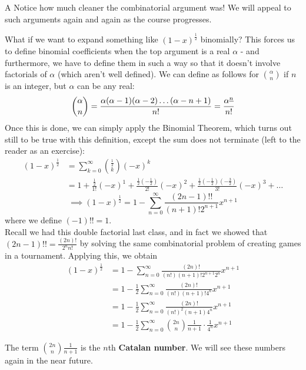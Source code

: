 \documentclass[11pt,twosided]{article}
\newcommand{\half}{\ensuremath{\frac{1}{2}}}
\begin{document}
\begin{reflection}{A}
Notice how much cleaner the combinatorial argument was! We will appeal to such arguments again and again as the course progresses.
\end{reflection}
What if we want to expand something like $(1-x)^{\frac{1}{2}}$ binomially? This forces us to define binomial coefficients when the top argument is a real $\alpha$ - and furthermore, we have to define them in such a way so that it doesn't involve factorials of $\alpha$ (which aren't well defined). We can define as follows for $\binom{\alpha}{n}$ if $n$ is an integer, but $\alpha$ can be any real: 
\[
	\binom{\alpha}{n} =  \frac{\alpha (\alpha - 1) (\alpha - 2) \ldots (\alpha - n + 1)}{n! } = \frac{{\alpha}^{\underline{n}}}{n!}
\]
Once this is done, we can simply apply the Binomial Theorem, which turns out still to be true with this definition, except the sum does not terminate (left to the reader as an exercise): 
\begin{align*}
(1-x)^{\frac{1}{2}} &= \sum_{k=0}^{\infty} \binom{\half}{k} (-x)^k \\
&= 1 + \frac{\half}{1!}(-x)^1 + \frac{\half \left(-\half \right)}{2!} (-x)^2 + \frac{\half \left(-\half \right) \left(-\frac{3}{2} \right)}{3!} (-x)^3  + \ldots 
\end{align*}
\[
\implies (1-x)^{\frac{1}{2}} = 1 - \sum_{n=0}^{\infty} \frac{(2n-1)!!}{(n+1)!2^{n+1}} x^{n+1}	
\]
where we define $(-1)!! = 1$. \\
Recall we had this double factorial last class, and in fact we showed that $(2n-1)!! = \frac{(2n)!}{2^n n!}$ by solving the same combinatorial problem of creating games in a tournament. Applying this, we obtain
\begin{align*}
(1-x)^{\frac{1}{2}} &= 1 - \sum_{n=0}^{\infty} \frac{(2n)!}{(n!)(n+1)!2^{n+1}2^n} x^{n+1}	\\
&= 1 - \frac{1}{2}\sum_{n=0}^{\infty} \frac{(2n)!}{(n!)(n+1)! 4^{n}} x^{n+1} \\
&= 1 - \frac{1}{2}\sum_{n=0}^{\infty} \frac{(2n)!}{(n!)^2(n+1) 4^{n}} x^{n+1}\\
&=  1 - \frac{1}{2}\sum_{n=0}^{\infty} \binom{2n}{n} \frac{1}{n+1}\cdot \frac{1}{4^n} x^{n+1}
\end{align*}
\begin{remark}
The term $\binom{2n}{n} \frac{1}{n+1}$ is the $n$th \textbf{Catalan number}. We will see these numbers again in the near future. 
\end{remark}
\end{document}

